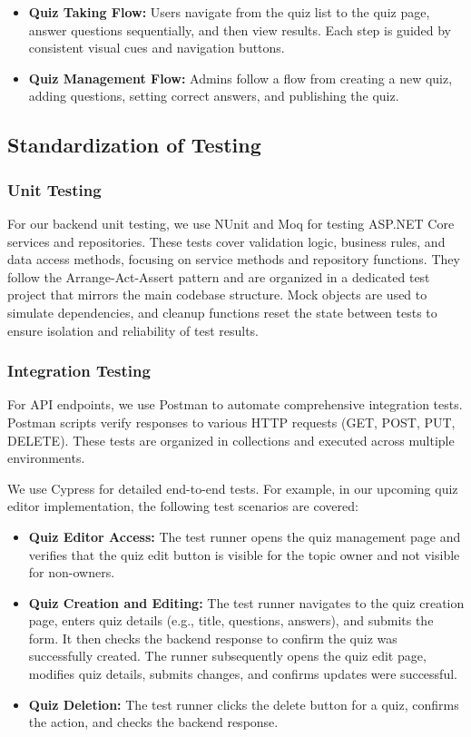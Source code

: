 \begin{itemize}
  \item \textbf{Quiz Taking Flow:} Users navigate from the quiz list to the quiz page, answer questions sequentially, and then view results. Each step is guided by consistent visual cues and navigation buttons.

  \item \textbf{Quiz Management Flow:} Admins follow a flow from creating a new quiz, adding questions, setting correct answers, and publishing the quiz.
\end{itemize}


\subsection{Standardization of Testing}

\subsubsection{Unit Testing}
For our backend unit testing, we use NUnit and Moq for testing ASP.NET Core services and repositories. These tests cover validation logic, business rules, and data access methods, focusing on service methods and repository functions. They follow the Arrange-Act-Assert pattern and are organized in a dedicated test project that mirrors the main codebase structure. Mock objects are used to simulate dependencies, and cleanup functions reset the state between tests to ensure isolation and reliability of test results.

\subsubsection{Integration Testing}
For API endpoints, we use Postman to automate comprehensive integration tests. Postman scripts verify responses to various HTTP requests (GET, POST, PUT, DELETE). These tests are organized in collections and executed across multiple environments.

We use Cypress for detailed end-to-end tests. For example, in our upcoming quiz editor implementation, the following test scenarios are covered:

\begin{itemize}
  \item \textbf{Quiz Editor Access:} The test runner opens the quiz management page and verifies that the quiz edit button is visible for the topic owner and not visible for non-owners.
  \item \textbf{Quiz Creation and Editing:} The test runner navigates to the quiz creation page, enters quiz details (e.g., title, questions, answers), and submits the form. It then checks the backend response to confirm the quiz was successfully created. The runner subsequently opens the quiz edit page, modifies quiz details, submits changes, and confirms updates were successful.
  \item \textbf{Quiz Deletion:} The test runner clicks the delete button for a quiz, confirms the action, and checks the backend response.
\end{itemize}


